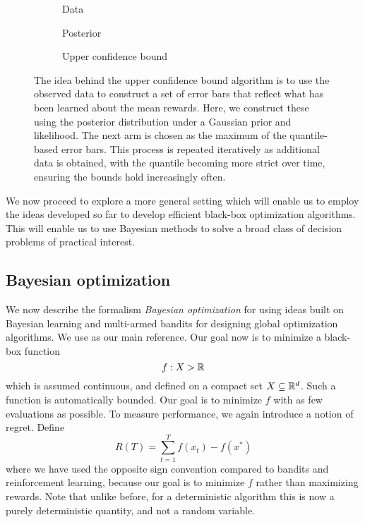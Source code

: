 \documentclass[11pt]{book}
\begin{document}
\begin{figure}
\begin{subfigure}{0.3\textwidth}

\caption{Data}
\end{subfigure}
\begin{subfigure}{0.3\textwidth}

\caption{Posterior}
\end{subfigure}
\begin{subfigure}{0.35\textwidth}

\caption{Upper confidence bound}
\end{subfigure}
\caption{The idea behind the upper confidence bound algorithm is to use the observed data to construct a set of error bars that reflect what has been learned about the mean rewards.
Here, we construct these using the posterior distribution under a Gaussian prior and likelihood.
The next arm is chosen as the maximum of the quantile-based error bars.
This process is repeated iteratively as additional data is obtained, with the quantile becoming more strict over time, ensuring the bounds hold increasingly often.}
\label{fig:bb-ucb}
\end{figure}

We now proceed to explore a more general setting which will enable us to employ the ideas developed so far to develop efficient black-box optimization algorithms.
This will enable us to use Bayesian methods to solve a broad class of decision problems of practical interest.

\subsection{Bayesian optimization}
\label{sec:bayesian-optimization}

We now describe the formalism  \emph{Bayesian optimization} for using ideas built on Bayesian learning and multi-armed bandits for designing global optimization algorithms.
We use \textcite{frazier18} as our main reference.
Our goal now is to minimize a black-box function
\[
f : X \-> \mathbb{R}    
\]
which is assumed continuous, and defined on a compact set $X \subseteq \mathbb{R}^d$.
Such a function is automatically bounded.
Our goal is to minimize $f$ with as few evaluations as possible.
To measure performance, we again introduce a notion of regret.
Define
\[
R(T) = \sum_{t=1}^T f(x_t) - f(x^*)    
\]
where we have used the opposite sign convention compared to bandits and reinforcement learning, because our goal is to minimize $f$ rather than maximizing rewards.
Note that unlike before, for a deterministic algorithm this is now a purely deterministic quantity, and not a random variable.
\end{document}
